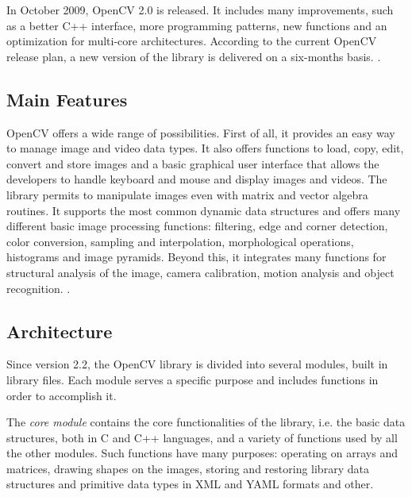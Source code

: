 	In October 2009, \mbox{OpenCV} 2.0 is released. It includes many improvements, such as a better C++ interface, more programming patterns, new functions and an optimization for multi-core architectures. According to the current \mbox{OpenCV} release plan, a new version of the library is delivered on a six-months basis. \cite{OpenCV:ChangeLogs}.


	\subsection{Main Features}
	\mbox{OpenCV} offers a wide range of possibilities. First of all, it provides an easy way to manage image and video data types. It also offers functions to load, copy, edit, convert and store images and a basic graphical user interface that allows the developers to handle keyboard and mouse and display images and videos. The library permits to manipulate images even with matrix and vector algebra routines. It supports the most common dynamic data structures and offers many different basic image processing functions: filtering, edge and corner detection, color conversion, sampling and interpolation, morphological operations, histograms and image pyramids. Beyond this, it integrates many functions for structural analysis of the image, camera calibration, motion analysis and object recognition. \cite{Agam2006}.

	
	\subsection{Architecture}
	Since version 2.2, the \mbox{OpenCV} library is divided into several modules, built in library files. Each module serves a specific purpose and includes functions in order to accomplish it. 

	The \emph{core module} contains the core functionalities of the library, i.e. the basic data structures, both in C and \mbox{C++} languages, and a variety of functions used by all the other modules. Such functions have many purposes: operating on arrays and matrices, drawing shapes on the images, storing and restoring library data structures and primitive data types in \mbox{XML} and \mbox{YAML} formats and other.
	

